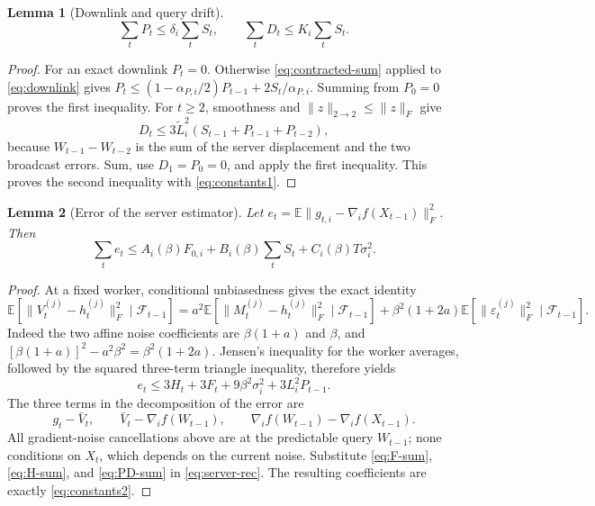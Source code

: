 \documentclass[11pt]{article}
\newtheorem{lemma}{Lemma}
\newcommand{\E}{\mathbb E}
\newcommand{\op}[1]{\lVert #1\rVert_{2\to2}}
\newcommand{\frob}[1]{\lVert #1\rVert_F}
\begin{document}
\begin{lemma}[Downlink and query drift]\label{lem:downlink}
\begin{equation}\label{eq:PD-sum}
 \sum_tP_t\le\delta_i\sum_tS_t,\qquad
 \sum_tD_t\le K_i\sum_tS_t.
\end{equation}
\end{lemma}
\begin{proof}
For an exact downlink $P_t=0$. Otherwise \eqref{eq:contracted-sum}
applied to \eqref{eq:downlink} gives
$P_t\le(1-\alpha_{P,i}/2)P_{t-1}+2S_t/\alpha_{P,i}$.
Summing from $P_0=0$ proves the first inequality.
For $t\ge2$, smoothness and $\op z\le\frob z$ give
\[
 D_t\le3\widetilde L_i^2(S_{t-1}+P_{t-1}+P_{t-2}),
\]
because $W_{t-1}-W_{t-2}$ is the sum of the server displacement and
the two broadcast errors. Sum, use $D_1=P_0=0$, and apply the first
inequality. This proves the second inequality with \eqref{eq:constants1}.
\end{proof}

\begin{lemma}[Error of the server estimator]\label{lem:server}
Let $e_t=\E\frob{g_{t,i}-\nabla_i f(X_{t-1})}^2$. Then
\begin{equation}\label{eq:server-sum}
 \sum_te_t\le A_i(\beta)F_{0,i}
           +B_i(\beta)\sum_t S_t+C_i(\beta)T\sigma_i^2.
\end{equation}
\end{lemma}
\begin{proof}
At a fixed worker, conditional unbiasedness gives the exact identity
\begin{equation}\label{eq:local-N-identity}
 \E[\frob{V_t^{(j)}-h_t^{(j)}}^2\mid\mathcal F_{t-1}]
 =a^2\E[\frob{M_t^{(j)}-h_t^{(j)}}^2\mid\mathcal F_{t-1}]
 +\beta^2(1+2a)
    \E[\frob{\varepsilon_t^{(j)}}^2\mid\mathcal F_{t-1}].
\end{equation}
Indeed the two affine noise coefficients are $\beta(1+a)$ and $\beta$,
and $[\beta(1+a)]^2-a^2\beta^2=\beta^2(1+2a)$.
Jensen's inequality for the worker averages, followed by the squared
three-term triangle inequality, therefore yields
\begin{equation}\label{eq:server-rec}
 e_t\le3H_t+3F_t+9\beta^2\sigma_i^2+3L_i^2P_{t-1}.
\end{equation}
The three terms in the decomposition of the error are
\[
 g_t-\bar V_t,\qquad \bar V_t-\nabla_i f(W_{t-1}),\qquad
 \nabla_i f(W_{t-1})-\nabla_i f(X_{t-1}).
\]
All gradient-noise cancellations above are at the predictable query
$W_{t-1}$; none conditions on $X_t$, which depends on the current noise.
Substitute \eqref{eq:F-sum}, \eqref{eq:H-sum}, and
\eqref{eq:PD-sum} in \eqref{eq:server-rec}. The resulting coefficients
are exactly \eqref{eq:constants2}.
\end{proof}
\end{document}
